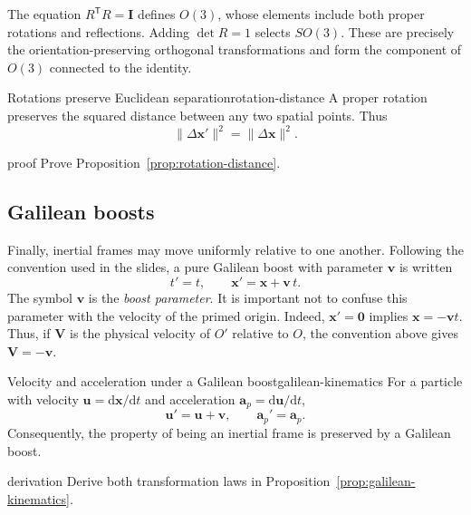 \documentclass[11pt,a4paper]{article}
\newcommand{\vect}[1]{\bm{#1}}
\newcommand{\dd}{\mathrm{d}}
\newcommand{\id}{\mathbf{I}}
\newcommand{\transpose}{\mathsf{T}}
\begin{document}
\begin{precision}
The equation \(R^{\transpose}R=\id\) defines \(O(3)\), whose elements include
both proper rotations and reflections. Adding \(\det R=1\) selects \(SO(3)\).
These are precisely the orientation-preserving orthogonal transformations and
form the component of \(O(3)\) connected to the identity.
\end{precision}

\begin{proposition}{Rotations preserve Euclidean separation}{rotation-distance}
A proper rotation preserves the squared distance between any two spatial
points. Thus
\[
  \lVert\Delta\vect{x}'\rVert^2
  =\lVert\Delta\vect{x}\rVert^2.
\]
\end{proposition}

\begin{studentwork}[height=6.0cm]{proof}
Prove Proposition~\ref{prop:rotation-distance}.
\end{studentwork}

\subsection{Galilean boosts}

Finally, inertial frames may move uniformly relative to one another.
Following the convention used in the slides, a pure Galilean boost with
parameter \(\vect v\) is written
\[
  t'=t,\qquad \vect{x}'=\vect{x}+\vect{v}\,t.
\]
The symbol \(\vect v\) is the \emph{boost parameter}. It is important not to
confuse this parameter with the velocity of the primed origin. Indeed,
\(\vect{x}'=\vect{0}\) implies \(\vect{x}=-\vect v t\). Thus, if \(\vect V\)
is the physical velocity of \(O'\) relative to \(O\), the convention above
gives \(\vect V=-\vect v\).

\begin{proposition}{Velocity and acceleration under a Galilean boost}{galilean-kinematics}
For a particle with velocity \(\vect{u}=\dd\vect{x}/\dd t\) and acceleration
\(\vect{a}_{\!p}=\dd\vect{u}/\dd t\),
\[
  \vect{u}'=\vect{u}+\vect{v},
  \qquad
  \vect{a}_{\!p}'=\vect{a}_{\!p}.
\]
Consequently, the property of being an inertial frame is preserved by a
Galilean boost.
\end{proposition}

\begin{studentwork}[height=9.0cm]{derivation}
Derive both transformation laws in
Proposition~\ref{prop:galilean-kinematics}.
\end{studentwork}
\end{document}
